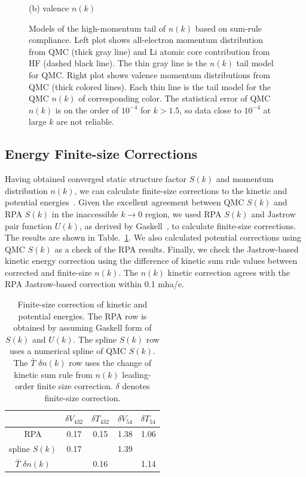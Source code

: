 \documentclass[aps,prl,superscriptaddress]{revtex4-1}
\newcommand{\midrule}{\hline}
\newcommand{\bottomrule}{\hline\hline}
\begin{document}
\begin{figure}[h]
\begin{minipage}{0.49\linewidth}
(b) valence $n(k)$
\end{minipage}
\caption{Models of the high-momentum tail of $n(k)$ based on sum-rule compliance. Left plot shows all-electron momentum distribution from QMC (thick gray line) and Li atomic core contribution from HF (dashed black line). The thin gray line is the $n(k)$ tail model for QMC. Right plot shows valence momentum distributions from QMC (thick colored lines). Each thin line is the tail model for the QMC $n(k)$ of corresponding color. The statistical error of QMC $n(k)$ is on the order of $10^{-4}$ for $k>1.5$, so data close to $10^{-4}$ at large $k$ are not reliable.}
\label{fig:qmc-tail-model}
\end{figure}

\subsection{Energy Finite-size Corrections}

Having obtained converged static structure factor $S(k)$ and momentum distribution $n(k)$, we can calculate finite-size corrections to the kinetic and potential energies~\cite{PhysRevLett.97.076404,Holzmann2016}.
Given the excellent agreement between QMC $S(k)$ and RPA $S(k)$ in the inaccessible $k\rightarrow0$ region, we used RPA $S(k)$ and Jastrow pair function $U(k)$, as derived by Gaskell~\cite{Gaskell1961}, to calculate finite-size corrections. The results are shown in Table.~\ref{tab:rpa-dtdv}.
We also calculated potential corrections using QMC $S(k)$ as a check of the RPA results. Finally, we check the Jastrow-based kinetic energy correction using the difference of kinetic sum rule values between corrected and finite-size $n(k)$. The $n(k)$ kinetic correction agrees with the RPA Jastrow-based correction within 0.1 mha/e.

\begin{table}[h]
\caption{Finite-size correction of kinetic and potential energies. The RPA row is obtained by assuming Gaskell form of $S(k)$ and $U(k)$. The spline $S(k)$ row uses a numerical spline of QMC $S(k)$. The $\bar{T}$ $\delta n(k)$ row uses the change of kinetic sum rule from $n(k)$ leading-order finite size correction. $\delta$ denotes finite-size correction. \label{tab:rpa-dtdv}}
\begin{tabular}{ccccc}
\toprule
& $\delta V_{432}$ & $\delta T_{432}$ & $\delta V_{54}$ & $\delta T_{54}$ \\
\midrule
RPA & 0.17 & 0.15 & 1.38 & 1.06 \\
spline $S(k)$ & 0.17 & & 1.39 & \\
$\bar{T}$ $\delta n(k)$ & & 0.16 & & 1.14 \\
\bottomrule
\end{tabular}
\end{table}
\end{document}

